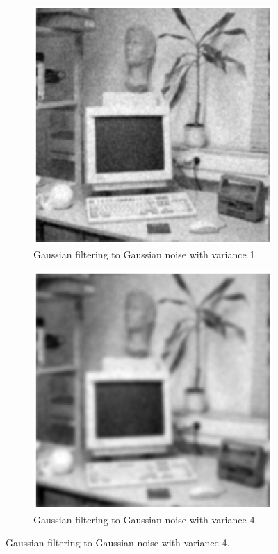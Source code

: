 \documentclass[11pt,a4paper]{article}
\begin{document}
\begin{itemize}
\begin{figure}[!ht]
\begin{subfigure}[t]{.32\linewidth}
			\includegraphics[width=\columnwidth]{Q17_Gauss_to_Gauss_1.eps}
			\caption{\scriptsize Gaussian filtering to Gaussian noise with variance 1.}
			\label{fig:gaussToGauss1}
		\end{subfigure}
		\begin{subfigure}[t]{.32\linewidth} %
			\includegraphics[width=\columnwidth]{Q17_Gauss_to_Gauss_4.eps}
			\caption{\scriptsize Gaussian filtering to Gaussian noise with variance 4.}
			\label{fig:gaussToGauss4}
		\end{subfigure}


\end{figure}
\end{itemize}
\end{document}
